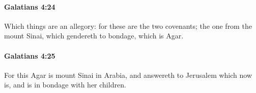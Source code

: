 		\paragraph{Galatians 4:24} %
			\label{GALATIANS-4-24}

			Which things are an allegory: for these are the two covenants; the one from the mount Sinai, which gendereth to bondage, which is Agar.

			\begin{framed}
			\scriptsize
				\begin{compactdesc}
					\item[SBLG] 
				\end{compactdesc}
			\end{framed}

		\paragraph{Galatians 4:25} %
			\label{GALATIANS-4-25}

			For this Agar is mount Sinai in Arabia, and answereth to Jerusalem which now is, and is in bondage with her children.

